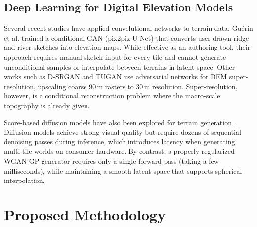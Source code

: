 \documentclass[conference]{IEEEtran}
\begin{document}
\subsection{Deep Learning for Digital Elevation Models}
Several recent studies have applied convolutional networks to terrain data. Gu\'erin et al. \cite{b10} trained a conditional GAN (pix2pix U-Net) that converts user-drawn ridge and river sketches into elevation maps. While effective as an authoring tool, their approach requires manual sketch input for every tile and cannot generate unconditional samples or interpolate between terrains in latent space. Other works such as D-SRGAN \cite{b11} and TUGAN \cite{b12} use adversarial networks for DEM super-resolution, upscaling coarse 90\,m rasters to 30\,m resolution. Super-resolution, however, is a conditional reconstruction problem where the macro-scale topography is already given.

Score-based diffusion models have also been explored for terrain generation \cite{b13}. Diffusion models achieve strong visual quality but require dozens of sequential denoising passes during inference, which introduces latency when generating multi-tile worlds on consumer hardware. By contrast, a properly regularized WGAN-GP generator requires only a single forward pass (taking a few milliseconds), while maintaining a smooth latent space that supports spherical interpolation.

\section{Proposed Methodology}
\end{document}
